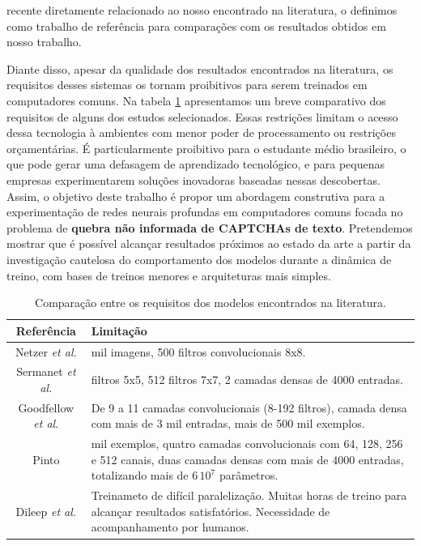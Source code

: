 recente diretamente relacionado ao nosso encontrado na literatura, o definimos como trabalho de referência para comparações com os resultados obtidos em nosso trabalho.

Diante disso, apesar da qualidade dos resultados encontrados na literatura, os requisitos desses sistemas os tornam proibitivos para serem treinados em computadores comuns. Na tabela \ref{tableredes} apresentamos um breve comparativo dos requisitos de alguns dos estudos selecionados. Essas restrições limitam o acesso dessa tecnologia à ambientes com menor poder de processamento ou restrições orçamentárias. É particularmente proibitivo para o estudante médio brasileiro, o que pode gerar uma defasagem de aprendizado tecnológico, e para pequenas empresas experimentarem soluções inovadoras baseadas nessas descobertas. Assim, o objetivo deste trabalho é propor um abordagem construtiva para a experimentação de redes neurais profundas em computadores comuns focada no problema de \textbf{quebra não informada de CAPTCHAs de texto}. Pretendemos mostrar que é possível alcançar resultados próximos ao estado da arte a partir da investigação cautelosa do comportamento dos modelos durante a dinâmica de treino, com bases de treinos menores e arquiteturas mais simples. 


\begin{table}[ht]
\begin{center}
	\caption{Comparação entre os requisitos dos modelos encontrados na literatura.}
	\begin{tabular}{ c | >{\centering\arraybackslash}m{7cm}  }
		Referência & Limitação  \\ %
		\hline \hline  
		Netzer \textit{et al.}     \cite{netzer2011reading}         &  600 mil imagens, 500 filtros convolucionais 8x8.  \\ \hline
		Sermanet \textit{et al.}   \cite{sermanet2012convolutional} &  16 filtros 5x5, 512 filtros 7x7, 2 camadas densas de 4000 entradas. \\ \hline
		Goodfellow \textit{et al.} \cite{captcha_break_2013}        &  De 9 a 11 camadas convolucionais (8-192 filtros), camada densa com mais de 3 mil entradas, mais de 500 mil exemplos.   \\ \hline
		Pinto \cite{otaro}											& 180 mil exemplos, quatro camadas convolucionais com 64, 128, 256 e 512 canais, duas camadas densas com mais de 4000 entradas, totalizando mais de $6 \, 10^{7}$ parâmetros.\\ \hline
		Dileep \textit{et al.} \cite{captcha_break_2017}			& Treinameto de difícil paralelização. Muitas horas de treino para alcançar resultados satisfatórios. Necessidade de acompanhamento por humanos.\\ \hline
\end{tabular}
	\label{tableredes}
\end{center}
\end{table}

